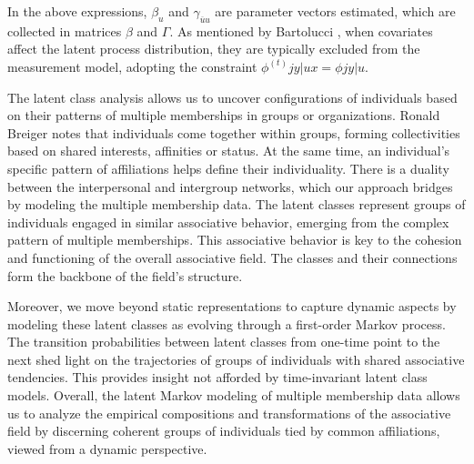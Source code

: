 In the above expressions, $\beta_u$ and $\gamma_{\overline{u}u}$ are parameter vectors estimated, which are collected in matrices $\beta$ and $\Gamma$. As mentioned by Bartolucci \parencite*{bartolucci_lmest_2017}, when covariates affect the latent process distribution, they are typically excluded from the measurement model, adopting the constraint $\phi^{(t)}{jy|ux}=\phi{jy|u}$.
\bigskip

The latent class analysis allows us to uncover configurations of individuals based on their patterns of multiple memberships in groups or organizations. Ronald Breiger \parencite*{breiger_duality_1974} notes that individuals come together within groups, forming collectivities based on shared interests, affinities or status. At the same time, an individual's specific pattern of affiliations helps define their individuality. There is a duality between the interpersonal and intergroup networks, which our approach bridges by modeling the multiple membership data. The latent classes represent groups of individuals engaged in similar associative behavior, emerging from the complex pattern of multiple memberships. This associative behavior is key to the cohesion and functioning of the overall associative field. The classes and their connections form the backbone of the field's structure.
\bigskip

Moreover, we move beyond static representations to capture dynamic aspects by modeling these latent classes as evolving through a first-order Markov process. The transition probabilities between latent classes from one-time point to the next shed light on the trajectories of groups of individuals with shared associative tendencies. This provides insight not afforded by time-invariant latent class models. Overall, the latent Markov modeling of multiple membership data allows us to analyze the empirical compositions and transformations of the associative field by discerning coherent groups of individuals tied by common affiliations, viewed from a dynamic perspective. 


